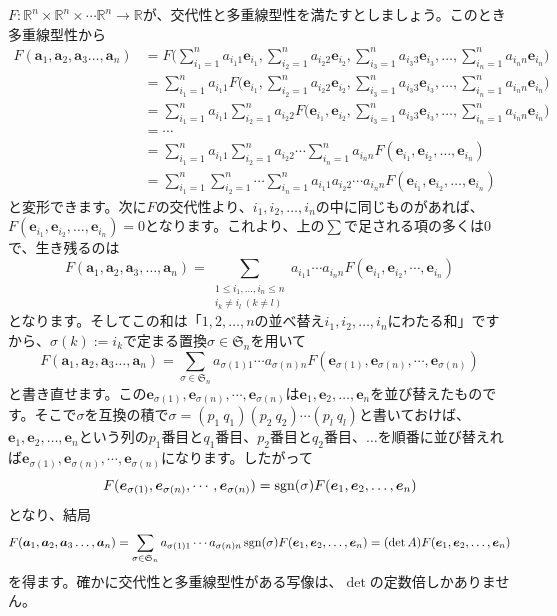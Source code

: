$F\colon \mathbb{R}^n \times \mathbb{R}^n \times \cdots \mathbb{R}^n \rightarrow \mathbb{R}$が、交代性と多重線型性を満たすとしましょう。このとき多重線型性から
\begin{align*}
F(\bm{a}_1, \bm{a}_2, \bm{a}_3 \ldots, \bm{a}_n)
&= F\Biggl( \sum_{i_1 = 1}^n a_{i_1 1}\bm{e}_{i_1} , \sum_{i_2 = 1}^n a_{i_2 2}\bm{e}_{i_2}, \sum_{i_3 = 1}^n a_{i_3 3}\bm{e}_{i_3}, \ldots, \sum_{i_n = 1}^n a_{i_n n}\bm{e}_{i_n}\Biggr) \\
&= \sum_{i_1 = 1}^n a_{i_1 1} F\biggl(\bm{e}_{i_1}, \sum_{i_2 = 1}^n a_{i_2 2}\bm{e}_{i_2}, \sum_{i_3 = 1}^n a_{i_3 3}\bm{e}_{i_3}, \ldots, \sum_{i_n = 1}^n a_{i_n n}\bm{e}_{i_n}\biggr) \\
&= \sum_{i_1 = 1}^n a_{i_1 1} \sum_{i_2 = 1}^n a_{i_2 2} F\biggl(\bm{e}_{i_1}, \bm{e}_{i_2}, \sum_{i_3 = 1}^n a_{i_3 3}\bm{e}_{i_3}, \ldots, \sum_{i_n = 1}^n a_{i_n n}\bm{e}_{i_n}\biggr) \\
&= \cdots \\
&= \sum_{i_1 = 1}^n a_{i_1 1} \sum_{i_2 = 1}^n a_{i_2 2} \cdots \sum_{i_n = 1}^n a_{i_n n}  F(\bm{e}_{i_1}, \bm{e}_{i_2}, \ldots, \bm{e}_{i_n}) \\
&= \sum_{i_1 = 1}^n \sum_{i_2 = 1}^n \cdots \sum_{i_n = 1}^n a_{i_1 1} a_{i_2 2} \cdots a_{i_n n}  F(\bm{e}_{i_1}, \bm{e}_{i_2}, \ldots, \bm{e}_{i_n})
\end{align*}
と変形できます。次に$F$の交代性より、$i_1, i_2, \ldots, i_n$の中に同じものがあれば、$F(\bm{e}_{i_1}, \bm{e}_{i_2}, \ldots, \bm{e}_{i_n}) = 0$となります。これより、上の$\sum$で足される項の多くは$0$で、生き残るのは
\[
F(\bm{a}_1, \bm{a}_2, \bm{a}_3, \ldots, \bm{a}_n) = \sum_{\substack{1 \leq i_1, \ldots, i_n \leq n \\ i_k \neq i_l \ (k \neq l)}} a_{i_1 1} \cdots a_{i_n n} F(\bm{e}_{i_1}, \bm{e}_{i_2}, \cdots, \bm{e}_{i_n})
\]
となります。そしてこの和は「$1, 2, \ldots, n$の並べ替え$i_1, i_2, \ldots, i_n$にわたる和」ですから、$\sigma(k) := i_k$で定まる置換$\sigma \in \mathfrak{S}_n$を用いて
\[
F(\bm{a}_1, \bm{a}_2, \bm{a}_3 \ldots, \bm{a}_n) = \sum_{\sigma \in \mathfrak{S}_n} a_{\sigma(1) 1} \cdots a_{\sigma(n) n} F(\bm{e}_{\sigma(1)}, \bm{e}_{\sigma(n)}, \cdots, \bm{e}_{\sigma(n)})
\]
と書き直せます。この$\bm{e}_{\sigma(1)}, \bm{e}_{\sigma(n)}, \cdots, \bm{e}_{\sigma(n)}$は$\bm{e}_1, \bm{e}_2, \ldots, \bm{e}_n$を並び替えたものです。そこで$\sigma$を互換の積で$\sigma = (p_1 \ q_1)(p_2 \ q_2) \cdots (p_l \ q_l)$と書いておけば、$\bm{e}_1, \bm{e}_2, \ldots, \bm{e}_n$という列の$p_1$番目と$q_1$番目、$p_2$番目と$q_2$番目、$\ldots$を順番に並び替えれば$\bm{e}_{\sigma(1)}, \bm{e}_{\sigma(n)}, \cdots, \bm{e}_{\sigma(n)}$になります。したがって
\[
F(\boldsymbol{e}_{\sigma(1)}, \boldsymbol{e}_{\sigma(n)}, \cdots, \boldsymbol{e}_{\sigma(n)}) = \operatorname{sgn}(\sigma) F(\boldsymbol{e}_1, \boldsymbol{e}_2, \ldots, \boldsymbol{e}_n)
\]
となり、結局
\[
F(\boldsymbol{a}_1, \boldsymbol{a}_2, \boldsymbol{a}_3 \ldots, \boldsymbol{a}_n) = \sum_{\sigma \in \mathfrak{S}_n} a_{\sigma(1) 1} \cdots a_{\sigma(n) n} \operatorname{sgn}(\sigma) F(\boldsymbol{e}_1, \boldsymbol{e}_2, \ldots, \boldsymbol{e}_n) = (\det A) F(\boldsymbol{e}_1, \boldsymbol{e}_2, \ldots, \boldsymbol{e}_n)
\]
を得ます。確かに交代性と多重線型性がある写像は、$\det$の定数倍しかありません。

